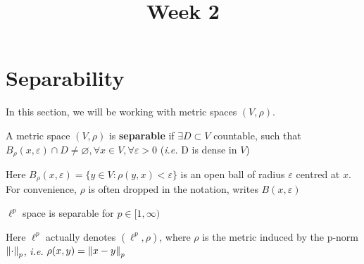 \documentclass{article}
\title{Week 2}
\author{\aut}
\begin{document}
\maketitle


\section{Separability}

In this section, we will be working with metric spaces \((V, \rho)\).

\begin{definition}[Separable]
	A metric space $(V,\rho)$ is \textbf{separable} if \(\exists D \subset V\) countable,
	such that \(B_{\rho}(x, \varepsilon) \cap D \neq \varnothing, \forall x \in V, \forall \varepsilon >0\)
	(\textit{i.e.} D is dense in \(V\))
\end{definition}

Here \(B_{\rho}(x, \varepsilon)=\{y \in V: \rho (y,x) < \varepsilon\}\) is an open ball of radius \(\varepsilon\)
centred at \(x\). For convenience, $\rho$ is often dropped in the notation, writes $B(x, \varepsilon)$

\begin{proposition}
	\(\ell^p\) space is separable for \(p \in [1, \infty)\)
\end{proposition}
Here $\ell^p$ actually denotes  \((\ell^p, \rho)\), where \(\rho\) is the metric induced by the p-norm \(\left\|{\cdot}\right\|_p\),
\textit{i.e.} \(\rho(x,y)=\left\|{x-y}\right\|_p\)
\end{document}
